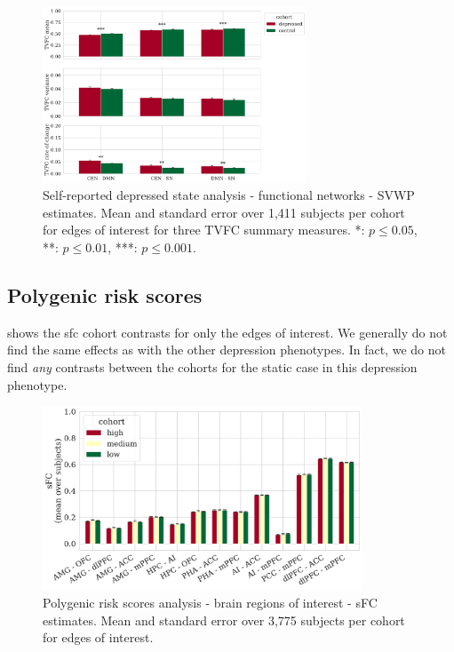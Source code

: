 \begin{figure}[h]
  \centering
  \includegraphics[width=0.7\textwidth]{fig/ukbiobank/TVFC_predictions_summaries/self_reported_depression_state/cohort_comparison/FN/correlation_all_TVFC_summary_measures_SVWP_joint_edges_of_interest}
  \caption{
    Self-reported depressed state analysis - functional networks - SVWP estimates.
    Mean and standard error over 1,411 subjects per cohort for edges of interest for three TVFC summary measures.
    *: $p \leq 0.05$, **: $p \leq 0.01$, ***: $p \leq 0.001$.
  }
  \label{fig:ukb-results-srds-fn-cohort-comparison-edges-of-interest-wp}
\end{figure}


\clearpage
\subsection{Polygenic risk scores}

 shows the \gls{sfc} cohort contrasts for only the edges of interest.
We generally do not find the same effects as with the other depression phenotypes.
In fact, we do not find \emph{any} contrasts between the cohorts for the static case in this depression phenotype.


\begin{figure}[h]
  \centering
  \includegraphics[width=0.85\textwidth]{fig/ukbiobank/TVFC_predictions_summaries/pgs/cohort_comparison/ROI/correlation_TVFC_mean_sFC_edges_of_interest}
  \caption{
    Polygenic risk scores analysis - brain regions of interest - sFC estimates.
    Mean and standard error over 3,775 subjects per cohort for edges of interest.
  }
  \label{fig:ukb-results-pgs-roi-cohort-comparison-edges-of-interest-sfc}
\end{figure}


